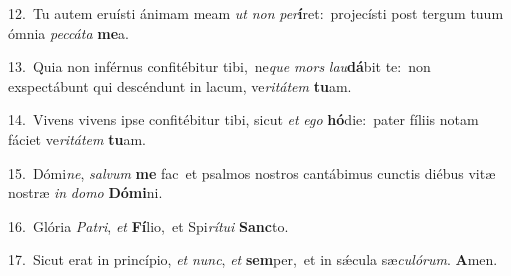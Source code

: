 {\numbfont\textcolor{\numbcolor}{12.}}~Tu autem eruísti ánimam meam \textit{ut} \textit{non} \textit{per}\-\textbf{í}ret:~\star projecísti post tergum tuum ómnia \textit{pec}\-\textit{cá}\textit{ta} \textbf{me}\-a.\par
{\numbfont\textcolor{\numbcolor}{13.}}~Quia non inférnus confitébitur tibi,~\dagger ne\textit{que} \textit{mors} \textit{lau}\-\textbf{dá}bit te:~\star non exspectábunt qui descéndunt in lacum, ve\-\textit{ri}\-\textit{tá}\textit{tem} \textbf{tu}\-am.\par
{\numbfont\textcolor{\numbcolor}{14.}}~Vivens vivens ipse confitébitur tibi, sicut \textit{et} \textit{e}\-\textit{go} \textbf{hó}\-die:~\star pater fíliis notam fáciet ve\-\textit{ri}\-\textit{tá}\textit{tem} \textbf{tu}\-am.\par
{\numbfont\textcolor{\numbcolor}{15.}}~Dómi\-\textit{ne}\-, \textit{sal}\-\textit{vum} \textbf{me} fac~\star et psalmos nostros cantábimus cunctis diébus vitæ nostræ \textit{in} \textit{do}\-\textit{mo} \textbf{Dó}\-\textbf{mi}ni.\par
{\numbfont\textcolor{\numbcolor}{16.}}~Glória \textit{Pa}\-\textit{tri}, \textit{et} \textbf{Fí}\-lio,~\star et Spi\-\textit{rí}\-\textit{tu}\textit{i} \textbf{Sanc}\-to.\par
{\numbfont\textcolor{\numbcolor}{17.}}~Sicut erat in princípio, \textit{et} \textit{nunc}\-, \textit{et} \textbf{sem}\-per,~\star et in sǽcula sæ\-\textit{cu}\-\textit{ló}\textit{rum}. \textbf{A}\-men.\par

